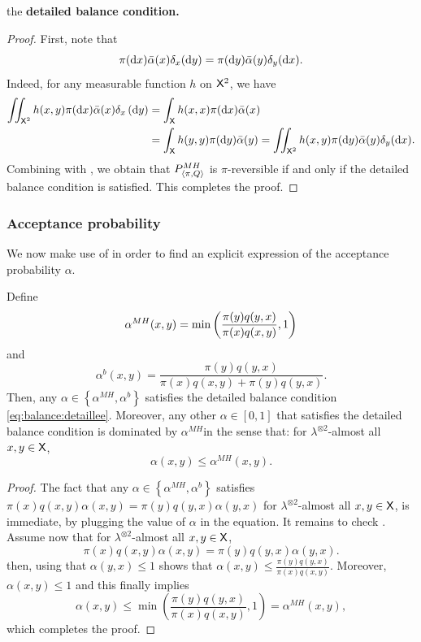 \documentclass[english,graybox,envcountchap,envcountsame,sectrefs,shortlabels]{svmono}
\theoremstyle{style}
\newenvironment{svmultproof}{\small \begin{proof}}{\end{proof}}
\newcommand{\bfr}{\begin{framed}}
\newcommand{\efr}{\end{framed}}
\begin{document}
the \textbf{detailed balance condition.}
\begin{svmultproof}
First, note that
\begin{equation}
\pi(\mathrm{d} x)\bar{\alpha}(x)\delta_{x}(\mathrm{d} y)=\pi(\mathrm{d} y)\bar{\alpha}(y)\delta_{y}(\mathrm{d} x).\label{eq:balance:dirac}
\end{equation}
Indeed, for any measurable function $h$ on $\mathsf{X}^{2}$, we have
\begin{align*}
\iint_{\mathsf{X}^{2}}h(x,y)\pi(\mathrm{d} x)\bar{\alpha}(x)\delta_{x}\left(\mathrm{d} y\right) & =\int_{\mathsf{X}}h(x,x)\pi(\mathrm{d} x)\bar{\alpha}(x)\\
 & =\int_{\mathsf{X}}h(y,y)\pi(\mathrm{d} y)\bar{\alpha}(y)=\iint_{\mathsf{X}^{2}}h(x,y)\pi(\mathrm{d} y)\bar{\alpha}(y)\delta_{y}(\mathrm{d} x).
\end{align*}
Combining  with , we obtain that
$P_{\langle\pi,Q\rangle}^{MH}$ is $\pi$-reversible if and only if the detailed balance
condition  is satisfied. This completes
the proof.
\end{svmultproof}


\subsubsection{Acceptance probability}
We now make use of  in order to find an explicit
expression of the acceptance probability $\alpha$.

\bfr
\begin{lemma}
\label{lem:acceptance} Define 
$$
\alpha^{MH}(x,y)=\min\left(\frac{\pi(y)q(y,x)}{\pi(x)q(x,y)},1\right)
$$
and 
$$
\alpha^{b}(x,y)=\frac{\pi(y)q(y,x)}{\pi(x)q(x,y)+\pi(y)q(y,x)}.
$$
Then, any $\alpha\in\left\{ \alpha^{MH},\alpha^{b}\right\} $ satisfies
the detailed balance condition \eqref{eq:balance:detaillee}. Moreover, any other $\alpha\in[0,1]$
that satisfies the detailed balance condition is dominated by $\alpha^{MH}$in
the sense that: for $\lambda^{\otimes2}$-almost all $x,y\in\mathsf{X}$,
\begin{equation}
\alpha(x,y)\leq\alpha^{MH}(x,y).\label{eq:accept:max}
\end{equation}

\end{lemma}
\efr
\begin{svmultproof}
The fact that any $\alpha\in\left\{ \alpha^{MH},\alpha^{b}\right\} $
satisfies $\pi(x)q(x,y)\alpha(x,y)=\pi(y)q(y,x)\alpha(y,x)$ for $\lambda^{\otimes2}$-almost
all $x,y\in\mathsf{X}$, is immediate, by plugging the value of $\alpha$ in the equation.
It remains to check . Assume now that for $\lambda^{\otimes2}$-almost
all $x,y\in\mathsf{X}$,
\[
\pi(x)q(x,y)\alpha(x,y)=\pi(y)q(y,x)\alpha(y,x).
\]
then, using that $\alpha(y,x)\leq1$ shows that $\alpha(x,y)\leq\frac{\pi(y)q(y,x)}{\pi(x)q(x,y)}$.
Moreover, $\alpha(x,y)\leq1$ and this finally implies
\[
\alpha(x,y)\leq\min\left(\frac{\pi(y)q(y,x)}{\pi(x)q(x,y)},1\right)=\alpha^{MH}(x,y),
\]
which completes the proof.
\end{svmultproof}
\end{document}
